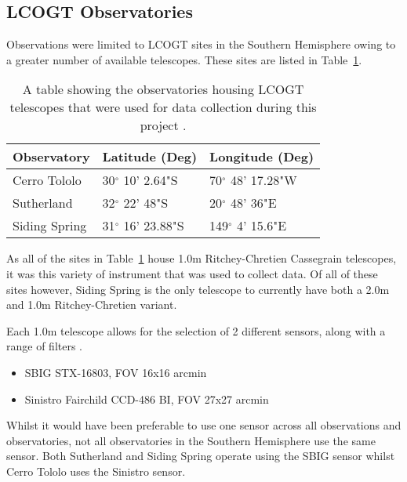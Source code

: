 \documentclass{report}
\begin{document}

\subsection{LCOGT Observatories}
Observations were limited to LCOGT sites in the Southern Hemisphere owing to a greater number of available telescopes. These sites are listed in Table~\ref{observatory}.

\begin{table}[H]
    \centering
    \begin{tabular}{ | l | l | l | }
    \hline \hline
    Observatory & Latitude (Deg) & Longitude (Deg)       \\ \hline \hline
    Cerro Tololo    & 30$^\circ$ 10' 2.64"S & 70$^\circ$ 48' 17.28"W  \\
    Sutherland   & 32$^\circ$ 22' 48"S & 20$^\circ$ 48' 36"E  \\
    Siding Spring  & 31$^\circ$ 16' 23.88"S & 149$^\circ$ 4' 15.6"E \\
    \hline
    \end{tabular}
    \caption{A table showing the observatories housing LCOGT telescopes that were used for data collection during this project \parencite{sites}.}
    \label{observatory}
\end{table}

As all of the sites in Table~\ref{observatory} house 1.0m Ritchey-Chretien Cassegrain telescopes, it was this variety of instrument that was used to collect data. Of all of these sites however, Siding Spring is the only telescope to currently have both a 2.0m and 1.0m Ritchey-Chretien variant. 

Each 1.0m telescope allows for the selection of 2 different sensors, along with a range of filters \parencite{1m}.

\begin{itemize}

  \item SBIG STX-16803, FOV 16x16 arcmin
  \item Sinistro Fairchild CCD-486 BI, FOV 27x27 arcmin

\end{itemize} 

Whilst it would have been preferable to use one sensor across all observations and observatories, not all observatories in the Southern Hemisphere use the same sensor. Both Sutherland and Siding Spring operate using the SBIG sensor whilst Cerro Tololo uses the Sinistro sensor.   
\end{document}

